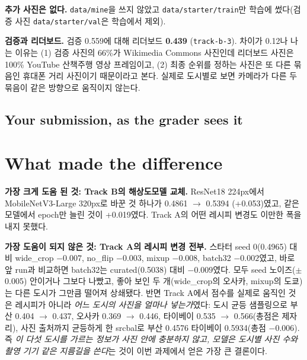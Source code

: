 \documentclass[11pt]{article}
\begin{document}
\textbf{추가 사진은 없다.} \texttt{data/mine}을 쓰지 않았고 \texttt{data/starter/train}만
학습에 썼다(검증 사진 \texttt{data/starter/val}은 학습에서 제외).

\textbf{검증과 리더보드.} 검증 0.559에 대해 리더보드 \textbf{0.439}
(\texttt{track-b-3}). 차이가 0.12나 나는 이유는 (1) 검증 사진의 66\%가 Wikimedia
Commons 사진인데 리더보드 사진은 100\% YouTube 산책\textperiodcentered{}주행 영상 프레임이고, (2) 최종
순위를 정하는 사진은 또 다른 묶음인 휴대폰 거리 사진이기 때문이라고 본다. 실제로
도시별로 보면 카메라가 다른 두 묶음이 같은 방향으로 움직이지 않는다.

\subsection*{Your submission, as the grader sees it}

\section*{What made the difference}

\textbf{가장 크게 도움 된 것: Track B의 해상도\textperiodcentered{}모델 교체.} ResNet18 224px에서
MobileNetV3-Large 320px로 바꾼 것 하나가 0.4861 $\rightarrow$ 0.5394 (+0.053)였고, 같은 모델에서
epoch만 늘린 것이 +0.019였다. Track A의 어떤 레시피 변경도 이만한 폭을 내지 못했다.

\textbf{가장 도움이 되지 않은 것: Track A의 레시피 변경 전부.} 스타터 seed 0(0.4965) 대비
wide\_crop $-0.007$, no\_flip $-0.003$, mixup $-0.008$, batch32 $-0.002$였고, 바로 앞 run과
비교하면 batch32는 curated(0.5038) 대비 $-0.009$였다. 모두 seed 노이즈($\pm$0.005) 안이거나
그보다 나빴고, 좋아 보인 두 개(wide\_crop의 오사카, mixup의 도쿄)는 다른 도시가 그만큼
떨어져 상쇄됐다.
반면 Track A에서 점수를 실제로 움직인 것은 레시피가 아니라 \emph{어느 도시의 사진을 얼마나
넣는가}였다: 도시 균등 샘플링으로 부산 0.404 $\rightarrow$ 0.437, 오사카 0.369 $\rightarrow$ 0.446, 타이베이
0.535 $\rightarrow$ 0.566(총점은 제자리), 사진 출처까지 균등하게 한 srcbal로 부산 0.4576 \textperiodcentered{} 타이베이
0.5934(총점 $-$0.006). 즉 \emph{이 다섯 도시를 가르는 정보가 사진 안에 충분하지 않고,
모델은 도시별 사진 수와 촬영 기기 같은 지름길을 쓴다}는 것이 이번 과제에서 얻은 가장 큰
결론이다.
\end{document}
